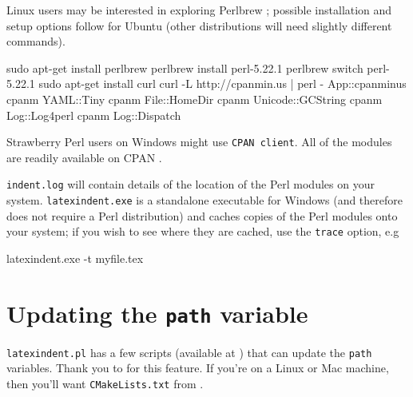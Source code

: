 		Linux users may be interested in exploring Perlbrew \cite{perlbrew}; possible installation and setup options follow for Ubuntu (other distributions will need slightly different commands).
		\begin{commandshell}
sudo apt-get install perlbrew
perlbrew install perl-5.22.1
perlbrew switch perl-5.22.1
sudo apt-get install curl
curl -L http://cpanmin.us | perl - App::cpanminus
cpanm YAML::Tiny
cpanm File::HomeDir
cpanm Unicode::GCString
cpanm Log::Log4perl
cpanm Log::Dispatch
\end{commandshell}

		Strawberry Perl users on Windows might use \texttt{CPAN client}.
		All of the modules are readily available on CPAN \cite{cpan}.

		\texttt{indent.log} will contain details of the location of the Perl modules on your system.
		\texttt{latexindent.exe} is a standalone executable for Windows (and therefore does not require a Perl distribution) and caches copies of the Perl modules onto your system; if you wish to see where they are cached, use the  \texttt{trace} option, e.g \begin{dosprompt}
latexindent.exe -t myfile.tex
 \end{dosprompt} 

	\section{Updating the \texttt{path} variable}
	 \label{sec:updating-path} \texttt{latexindent.pl} has a few scripts (available at \cite{latexindent-home}) that can update the \texttt{path} variables.
	 Thank you to \cite{jasjuang} for this feature.
	 If you're on a Linux or Mac machine, then you'll want \texttt{CMakeLists.txt} from \cite{latexindent-home}.
